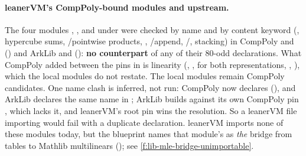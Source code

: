 \paragraph{leanerVM's CompPoly-bound modules and upstream.} The four modules
, ,  and
 under \allowbreak{}\allowbreak{} were checked by name and by content keyword (, hypercube sums,
/pointwise products, , /append,
/, stacking) in CompPoly  and
 (\allowbreak{}) and ArkLib  and 
(\allowbreak{}): \textbf{no counterpart} of any of their 80-odd declarations. What
CompPoly added between the pins in \allowbreak{} is linearity (,
,  for both representations, ,
), which the local modules do not restate. The local modules remain
CompPoly candidates. One name clash is inferred, not run: CompPoly  now declares
\allowbreak{}\allowbreak{}\allowbreak{} (\allowbreak{}\allowbreak{}), and
ArkLib  declares the same name in \allowbreak{}\allowbreak{}\allowbreak{};
ArkLib builds against its own CompPoly pin , which lacks it, and leanerVM's root
pin  wins the resolution. So a leanerVM file importing
\allowbreak{}\allowbreak{}\allowbreak{} would fail with a duplicate declaration. leanerVM
imports none of these modules today, but the blueprint names that module's
 as \emph{the} bridge from tables to Mathlib multilinears
(); see \cref{f:lib-mle-bridge-unimportable}.

\par\endgroup